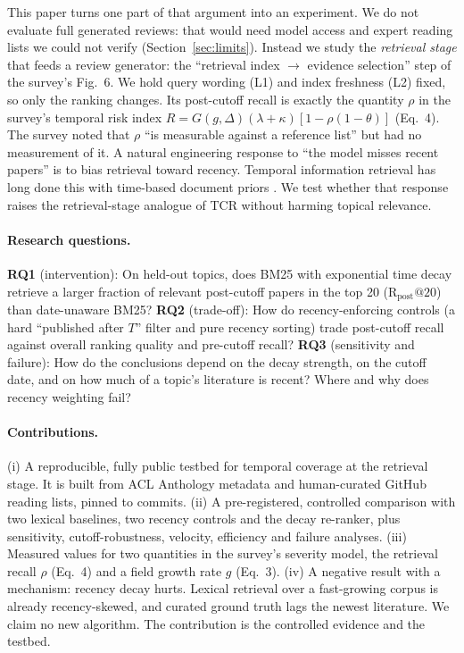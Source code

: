 \documentclass[acmsmall]{acmart}
\makeatletter
\newcommand{\Rpost}{\mathrm{R}_{\text{post}}@20}
\makeatother
\begin{document}
This paper turns one part of that argument into an experiment. We do not evaluate full generated reviews: that would need model access and expert reading lists we could not verify (Section~\ref{sec:limits}). Instead we study the \emph{retrieval stage} that feeds a review generator: the ``retrieval index $\rightarrow$ evidence selection'' step of the survey's Fig.~6. We hold query wording (L1) and index freshness (L2) fixed, so only the ranking changes. Its post-cutoff recall is exactly the quantity $\rho$ in the survey's temporal risk index $R=G(g,\Delta)(\lambda+\kappa)[1-\rho(1-\theta)]$ (Eq.~4). The survey noted that $\rho$ ``is measurable against a reference list'' but had no measurement of it. A natural engineering response to ``the model misses recent papers'' is to bias retrieval toward recency. Temporal information retrieval has long done this with time-based document priors \cite{li2003timebased,campos2014survey}. We test whether that response raises the retrieval-stage analogue of TCR without harming topical relevance.

\paragraph{Research questions.}
\textbf{RQ1} (intervention): On held-out topics, does BM25 with exponential time decay retrieve a larger fraction of relevant post-cutoff papers in the top 20 ($\Rpost$) than date-unaware BM25?
\textbf{RQ2} (trade-off): How do recency-enforcing controls (a hard ``published after $T$'' filter and pure recency sorting) trade post-cutoff recall against overall ranking quality and pre-cutoff recall?
\textbf{RQ3} (sensitivity and failure): How do the conclusions depend on the decay strength, on the cutoff date, and on how much of a topic's literature is recent? Where and why does recency weighting fail?

\paragraph{Contributions.} (i) A reproducible, fully public testbed for temporal coverage at the retrieval stage. It is built from ACL Anthology metadata and human-curated GitHub reading lists, pinned to commits. (ii) A pre-registered, controlled comparison with two lexical baselines, two recency controls and the decay re-ranker, plus sensitivity, cutoff-robustness, velocity, efficiency and failure analyses. (iii) Measured values for two quantities in the survey's severity model, the retrieval recall $\rho$ (Eq.~4) and a field growth rate $g$ (Eq.~3). (iv) A negative result with a mechanism: recency decay hurts. Lexical retrieval over a fast-growing corpus is already recency-skewed, and curated ground truth lags the newest literature. We claim no new algorithm. The contribution is the controlled evidence and the testbed.
\end{document}

